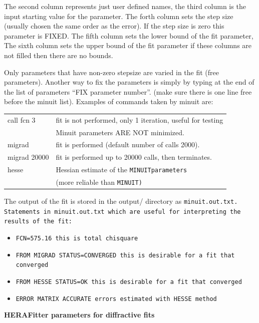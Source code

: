 \begin{description}
The second column represents just user defined names,
the third column is  the input starting value for the parameter.
The forth column sets the step size (usually chosen the same order as the error).
If the step size is zero this parameter is FIXED.
The fifth column sets the lower bound of the fit parameter, 
The sixth column sets the upper bound of the fit parameter
if these columns are not filled then there are no bounds.

Only parameters that have non-zero stepsize are varied 
in the fit (free parameters). Another way to fix the parameters is
simply by typing at the end of the list of parameters ``FIX parameter number''.  
(make sure there is one line free before the minuit list).
Examples of commands taken by minuit are:\\

\begin{tabular}{ll}
call fcn 3  &   fit is not performed, only 1 iteration, useful for testing\\
            &    Minuit parameters ARE NOT minimized. \\
migrad       & fit is performed (default number of calls 2000).\\
migrad 20000 & fit is performed up to 20000 calls, then terminates.\\
hesse        & Hessian estimate of the \tt{MINUIT}\rm parameters \\
& (more reliable than \tt{MINUIT}\rm)\\
\end{tabular}


The output of the fit is stored in the output/ directory as \tt{minuit.out.txt}\rm.
Statements in minuit.out.txt which are useful for interpreting the results of the fit:
\begin{itemize}
\item \tt{FCN=575.16}\rm  \; this is total chisquare
\item \tt{FROM MIGRAD   STATUS=CONVERGED}\rm \; this is desirable for a fit that converged
\item \tt{FROM HESSE     STATUS=OK}\rm       \; this is desirable for a fit that converged 
\item \tt{ERROR MATRIX ACCURATE}   \rm       \; errors estimated with HESSE method
\end{itemize}

{\bf HERAFitter parameters for diffractive fits} \\
\label{sec:HFitterPar}


\end{description}
